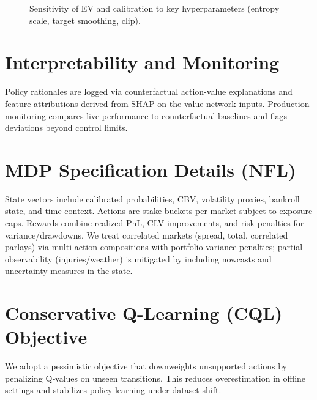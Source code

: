 \begin{figure}[t]
  \centering
  \caption{Sensitivity of EV and calibration to key hyperparameters (entropy scale, target smoothing, clip).}
  \label{fig:hparam-sens}
\end{figure}

\section{Interpretability and Monitoring}
Policy rationales are logged via counterfactual action-value explanations and feature attributions derived from SHAP on the value network inputs. Production monitoring compares live performance to counterfactual baselines and flags deviations beyond control limits.

\section{MDP Specification Details (NFL)}
State vectors include calibrated probabilities, CBV, volatility proxies, bankroll state, and time context. Actions are stake buckets per market subject to exposure caps. Rewards combine realized PnL, CLV improvements, and risk penalties for variance/drawdowns.
We treat correlated markets (spread, total, correlated parlays) via multi-action compositions with portfolio variance penalties; partial observability (injuries/weather) is mitigated by including nowcasts and uncertainty measures in the state.

\section{Conservative Q-Learning (CQL) Objective}
We adopt a pessimistic objective that downweights unsupported actions by penalizing Q‑values on unseen transitions. This reduces overestimation in offline settings and stabilizes policy learning under dataset shift.

